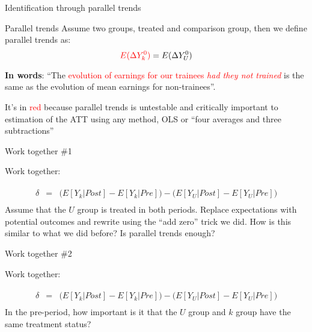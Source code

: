\documentclass{beamer}
\begin{document}
\begin{frame}{Identification through parallel trends}
	

	\begin{block}{Parallel trends}
	Assume two groups, treated and comparison group, then we define parallel trends as:	 $$\textcolor{red}{E(}\textcolor{red}{\Delta Y^0_k)} = E(\Delta Y^0_U)$$
	\end{block}

\textbf{In words}: ``The \textcolor{red}{evolution of earnings for our trainees \emph{had they not trained}} is the same as the evolution of mean earnings for non-trainees''.  

\bigskip

It's in \textcolor{red}{red} because parallel trends is untestable and critically important to estimation of the ATT using any method, OLS or ``four averages and three subtractions''

	

	
\end{frame}

\begin{frame}{Work together \#1}

Work together: 

\begin{eqnarray*}
\widehat{\delta} &=& \bigg ( E[Y_k|Post] - E[Y_k|Pre] \bigg ) - \bigg ( E[Y_U | Post ] - E[ Y_U | Pre] \bigg) \\
\end{eqnarray*}Assume that the $U$ group is treated in both periods.  Replace expectations with potential outcomes and rewrite using the ``add zero'' trick we did.  How is this similar to what we did before?  Is parallel trends enough?


\end{frame}

\begin{frame}{Work together \#2}

Work together: 

\begin{eqnarray*}
\widehat{\delta} &=& \bigg ( E[Y_k|Post] - E[Y_k|Pre] \bigg ) - \bigg ( E[Y_U | Post ] - E[ Y_U | Pre] \bigg) \\
\end{eqnarray*}In the pre-period, how important is it that the $U$ group and $k$ group have the same treatment status?  


\end{frame}
\end{document}
